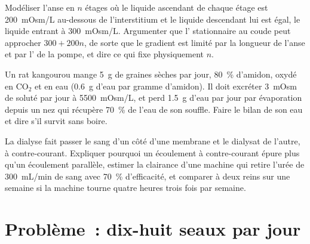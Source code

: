 \begin{exercise}[$\star\star\star$]\label{exo:b3:renal-osmoregulation:10}
Modéliser l'anse en $n$ étages où le liquide ascendant de chaque étage
est \qty{200}{mOsm/L} au-dessous de l'interstitium et le liquide
descendant lui est égal, le liquide entrant à \qty{300}{mOsm/L}.
Argumenter que l' stationnaire au coude peut approcher $300 +
200n$, de sorte que le gradient est limité par la longueur de l'anse et
par l' de la pompe, et dire ce qui fixe physiquement $n$.
\end{exercise}

\begin{exercise}[$\star\star\star$]\label{exo:b3:renal-osmoregulation:11}
Un rat kangourou mange \qty{5}{g} de graines sèches par jour,
\qty{80}{\%} d'amidon, oxydé en CO$_{2}$ et en eau (\qty{0.6}{g} d'eau
par gramme d'amidon). Il doit excréter \qty{3}{mOsm} de soluté par jour
à \qty{5500}{mOsm/L}, et perd \qty{1.5}{g} d'eau par jour par
évaporation depuis un nez qui récupère \qty{70}{\%} de l'eau de son
souffle. Faire le bilan de son eau et dire s'il survit sans boire.
\end{exercise}

\begin{exercise}[$\star\star\star$]\label{exo:b3:renal-osmoregulation:12}
La dialyse fait passer le sang d'un côté d'une membrane et le dialysat
de l'autre, à contre-courant. Expliquer pourquoi un écoulement à
contre-courant épure plus qu'un écoulement parallèle, estimer la
clairance d'une machine qui retire l'urée de \qty{300}{mL/min} de sang
avec \qty{70}{\%} d'efficacité, et comparer à deux reins sur une semaine
si la machine tourne quatre heures trois fois par semaine.
\end{exercise}

\section{Problème~: dix-huit seaux par jour}

